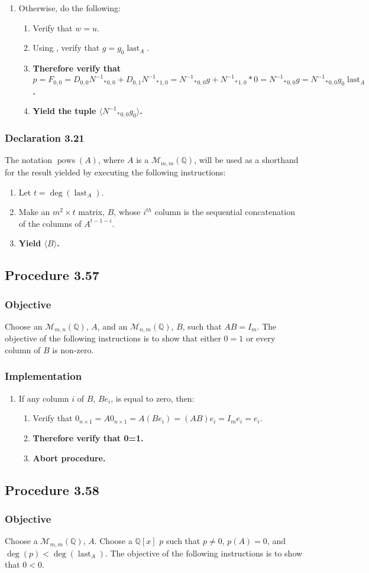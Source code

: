 \documentclass[twocolumn]{article}
\DeclareMathOperator{\pows}{pows}
\DeclareMathOperator{\last}{last}
\newcommand{\declaration}[1]{\subsubsection*{Declaration #1}\label{sec:declaration #1}}
\newcommand{\procedure}[2][]{\subsection*{Procedure #2 \ifthenelse{\equal{#1}{}}{}{(#1)}}\label{sec:procedure #2}}
\newcommand{\objective}{\subsubsection*{Objective}}
\newcommand{\implementation}{\subsubsection*{Implementation}}
\newcommand{\procedurehr}[2][]{\hyperref[sec:procedure #2]{\ifthenelse{\equal{#1}{}}{procedure #2}{#1}}}
\begin{document}
\begin{enumerate}
\begin{enumerate}
					\end{enumerate}
					\item Otherwise, do the following:
					\begin{enumerate}
						\item Verify that $w=u$.
						\item Using \procedurehr{3.55}, verify that $g=g_0\last_A$.
						\item \textbf{Therefore verify that $p=F_{0,0}=D_{0,0}{{N^{-1}}_*}_{0,0}+D_{0,1}{{N^{-1}}_*}_{1,0}={{N^{-1}}_*}_{0,0}g+{{N^{-1}}_*}_{1,0}*0={{N^{-1}}_*}_{0,0}g={{N^{-1}}_*}_{0,0}g_0\last_A$.}
						\item \textbf{Yield the tuple $\langle {{N^{-1}}_*}_{0,0}g_0\rangle$.}
					\end{enumerate}
				\end{enumerate}
		\declaration{3.21}
			The notation $\pows(A)$, where $A$ is a $\mathcal{M}_{m,m}(\mathbb{Q})$, will be used as a shorthand for the result yielded by executing the following instructions:
			\begin{enumerate}
				\item Let $t=\deg(\last_A)$.
				\item Make an $m^2\times t$ matrix, $B$, whose $i^{th}$ column is the sequential concatenation of the columns of $A^{t-1-i}$.
				\item \textbf{Yield $\langle B\rangle$.}
			\end{enumerate}
		\procedure{3.57}
			\objective
				Choose an $\mathcal{M}_{m,n}(\mathbb{Q})$, $A$, and an $\mathcal{M}_{n,m}(\mathbb{Q})$, $B$, such that $AB=I_m$. The objective of the following instructions is to show that either $0=1$ or every column of $B$ is non-zero.
			\implementation
				\begin{enumerate}
					\item If any column $i$ of $B$, $Be_i$, is equal to zero, then:
					\begin{enumerate}
						\item Verify that $0_{n\times 1}=A0_{n\times 1}=A(Be_i)=(AB)e_i=I_me_i=e_i$.
						\item \textbf{Therefore verify that 0=1.}
						\item \textbf{Abort procedure.}
					\end{enumerate}
				\end{enumerate}
		\procedure{3.58}
			\objective
				Choose a $\mathcal{M}_{m,m}(\mathbb{Q})$, $A$. Choose a $\mathbb{Q}[x]$ $p$ such that $p\ne 0$, $p(A)=0$, and $\deg(p)<\deg(\last_A)$. The objective of the following instructions is to show that $0<0$.
\end{document}
